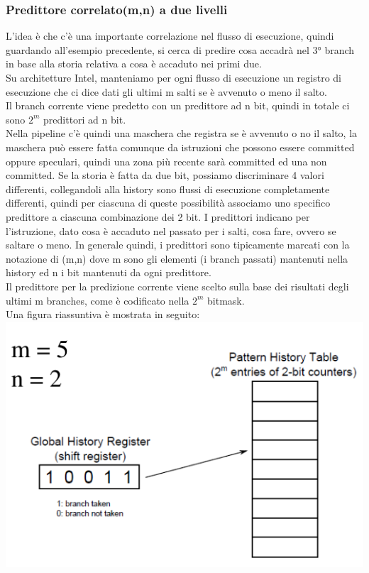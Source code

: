 \documentclass[14pt, oneside]{book}
\begin{document}
\subsubsection{Predittore correlato(m,n) a due livelli}
L'idea è che c'è una importante correlazione nel flusso di esecuzione, quindi guardando all'esempio precedente, si cerca di predire cosa accadrà nel 3° branch in base alla storia relativa a cosa è accaduto nei primi due.\\ Su architetture Intel, manteniamo per ogni flusso di esecuzione un registro di esecuzione che ci dice dati gli ultimi m salti se è avvenuto o meno il salto. \\ Il branch corrente viene predetto con un predittore ad n bit, quindi in totale ci sono $2^m$ predittori ad n bit.\\
Nella pipeline c'è quindi una maschera che registra se è avvenuto o no il salto, la maschera può essere fatta comunque da istruzioni che possono essere committed oppure speculari, quindi una zona più recente sarà committed ed una non committed. Se la storia è fatta da due bit, possiamo discriminare 4 valori differenti, collegandoli alla history sono flussi di esecuzione completamente differenti, quindi per ciascuna di queste possibilità associamo uno specifico predittore a ciascuna combinazione dei 2 bit. I predittori indicano per l'istruzione, dato cosa è accaduto nel passato per i salti, cosa fare, ovvero se saltare o meno. In generale quindi, i predittori sono tipicamente marcati con la notazione di (m,n) dove m sono gli elementi (i branch passati) mantenuti nella history ed n i bit mantenuti da ogni predittore.\\ Il predittore per la predizione corrente viene scelto sulla base dei risultati degli ultimi m branches, come è codificato nella $2^m$ bitmask.\\ Una figura riassuntiva è mostrata in seguito:\\
\includegraphics[scale=0.4]{immagini/corr_pred}
\end{document}
